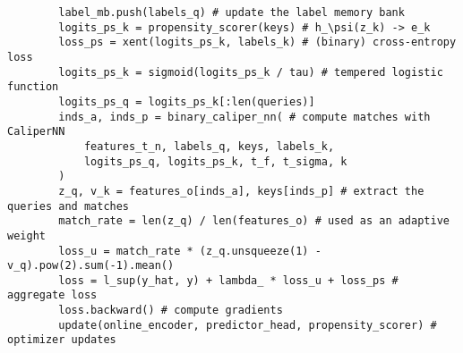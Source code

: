 \begin{algorithm}[ht]
\begin{verbatim}
        label_mb.push(labels_q) # update the label memory bank
        logits_ps_k = propensity_scorer(keys) # h_\psi(z_k) -> e_k
        loss_ps = xent(logits_ps_k, labels_k) # (binary) cross-entropy loss
        logits_ps_k = sigmoid(logits_ps_k / tau) # tempered logistic function
        logits_ps_q = logits_ps_k[:len(queries)]
        inds_a, inds_p = binary_caliper_nn( # compute matches with CaliperNN
            features_t_n, labels_q, keys, labels_k,
            logits_ps_q, logits_ps_k, t_f, t_sigma, k
        )
        z_q, v_k = features_o[inds_a], keys[inds_p] # extract the queries and matches
        match_rate = len(z_q) / len(features_o) # used as an adaptive weight
        loss_u = match_rate * (z_q.unsqueeze(1) - v_q).pow(2).sum(-1).mean()
        loss = l_sup(y_hat, y) + lambda_ * loss_u + loss_ps # aggregate loss
        loss.backward() # compute gradients
        update(online_encoder, predictor_head, propensity_scorer) # optimizer updates

    \end{verbatim}
\end{algorithm}
